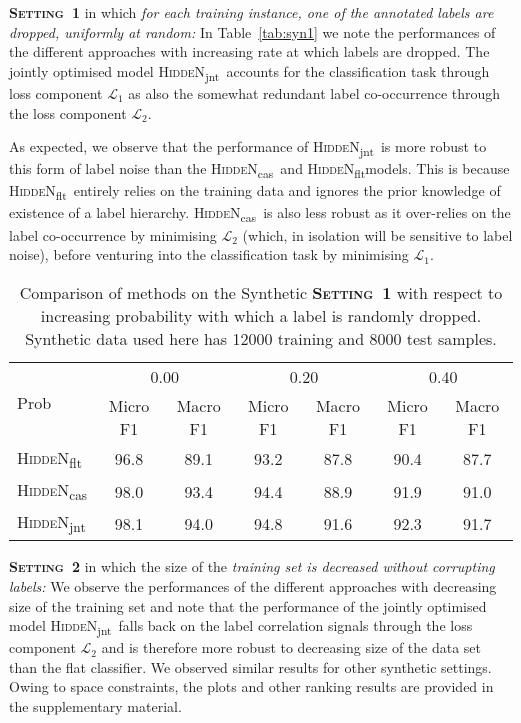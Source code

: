 \documentclass[11pt,a4paper]{article}
\newcommand{\modeljnt}{\mbox{\textsc{HiddeN}\textsubscript{jnt}}}
\newcommand{\modelcas}{\mbox{\textsc{HiddeN}\textsubscript{cas}}}
\newcommand{\modelflt}{\mbox{\textsc{HiddeN}\textsubscript{flt}}}
\begin{document}
{\bf \mbox{\textsc{Setting 1}}} in which {\em for each training instance, one of the annotated labels are dropped, uniformly at random:} In Table~\ref{tab:syn1} we note the performances of the different approaches with increasing rate at which labels are dropped. The jointly optimised model \modeljnt\ accounts for the classification task through loss component ${\mathcal L}_1$ as also the somewhat redundant label co-occurrence through the loss component ${\mathcal L}_2$. 

As expected, we observe that the performance of \modeljnt\ is more robust to this form of label noise than the \modelcas\ and \modelflt models. This is because \modelflt\ entirely relies on the training data and ignores the prior knowledge of existence of a label hierarchy. \modelcas\ is also less robust as it over-relies on the label co-occurrence by minimising ${\mathcal L}_2$ (which, in isolation will be sensitive to label noise), before venturing into the classification task by minimising ${\mathcal L}_1$.

\begin{table}
\caption{Comparison of methods on the Synthetic {\bf \mbox{\textsc{Setting 1}}} 
with respect to increasing probability with which a label is randomly dropped. Synthetic data used here has 12000 training and 8000 test samples.}
\label{tab:syn1}
\begin{adjustbox}{max width=0.48\textwidth}
\begin{tabular}{l|cc|cc|cc}
\hline
\multirow{2}{*}{Prob} & \multicolumn{2}{c|}{0.00} & \multicolumn{2}{c|}{0.20} & \multicolumn{2}{c}{0.40} \\ \cline{2-7} 
 & Micro F1 & Macro F1 & Micro F1 & Macro F1 & Micro F1 & Macro F1 \\ \hline
\modelflt & 96.8 & 89.1 & 93.2 & 87.8 & 90.4 & 87.7 \\
\modelcas & 98.0 & 93.4 & 94.4 & 88.9 & 91.9 & 91.0 \\
\modeljnt & 98.1 & 94.0 & 94.8 & 91.6 & 92.3 & 91.7 \\
\hline
\end{tabular}
\label{tab:synth1}
\end{adjustbox}
\end{table}

{\bf \mbox{\textsc{Setting 2}}} in which the size of the {\em training set is decreased without corrupting labels:} 
We observe the performances of the different approaches with decreasing size of the training set and note that the performance of the jointly optimised model \modeljnt\ falls back on the label correlation signals through the loss component ${\mathcal L}_2$ and is therefore more robust to decreasing size of the data set than the flat classifier. We observed similar results for other synthetic settings. Owing to space constraints, the plots and other ranking results are provided in the supplementary material.
\end{document}
